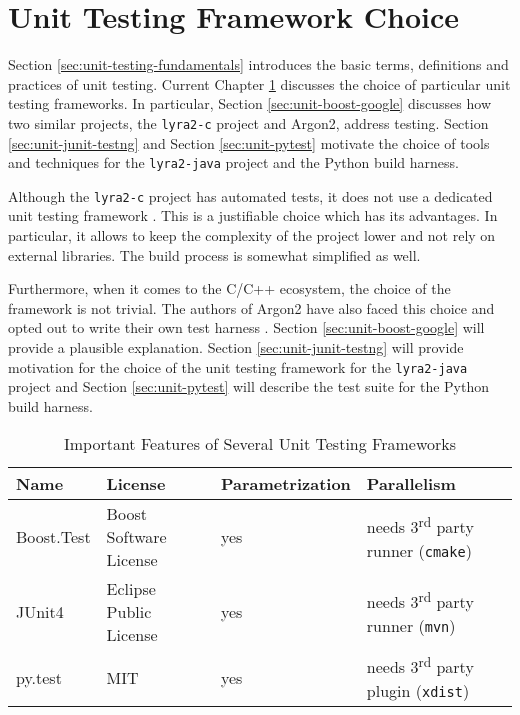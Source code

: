 \chapter{Unit Testing Framework Choice}
\label{sec:unit-testing-framework-choice}

Section \ref{sec:unit-testing-fundamentals} introduces the basic terms, definitions and practices of unit testing. Current Chapter \ref{sec:unit-testing-framework-choice} discusses the choice of particular unit testing frameworks. In particular, Section \ref{sec:unit-boost-google} discusses how two similar projects, the \texttt{lyra2-c} project and Argon2, address testing. Section \ref{sec:unit-junit-testng} and Section \ref{sec:unit-pytest} motivate the choice of tools and techniques for the \texttt{lyra2-java} project and the Python build harness.

Although the \texttt{lyra2-c} project has automated tests, it does not use a dedicated unit testing framework \cite{github:2017:lyra}. This is a justifiable choice which has its advantages. In particular, it allows to keep the complexity of the project lower and not rely on external libraries. The build process is somewhat simplified as well.

Furthermore, when it comes to the C/C++ ecosystem, the choice of the framework is not trivial. The authors of Argon2 have also faced this choice and opted out to write their own test harness \cite{github:2017:argon2-test.c}. Section \ref{sec:unit-boost-google} will provide a plausible explanation. Section \ref{sec:unit-junit-testng} will provide motivation for the choice of the unit testing framework for the \texttt{lyra2-java} project and Section \ref{sec:unit-pytest} will describe the test suite for the Python build harness.

\begin{table}
\begin{tabular}{llll}
    Name & License & Parametrization & Parallelism \\ \hline
Boost.Test & Boost Software License & yes & needs 3\textsuperscript{rd} party runner (\texttt{cmake}) \\
JUnit4 & Eclipse Public License & yes & needs 3\textsuperscript{rd} party runner (\texttt{mvn}) \\
py.test & MIT & yes & needs 3\textsuperscript{rd} party plugin (\texttt{xdist})
\end{tabular}
\caption{Important Features of Several Unit Testing Frameworks}
\label{table:framework-features-cpp}
\end{table}

